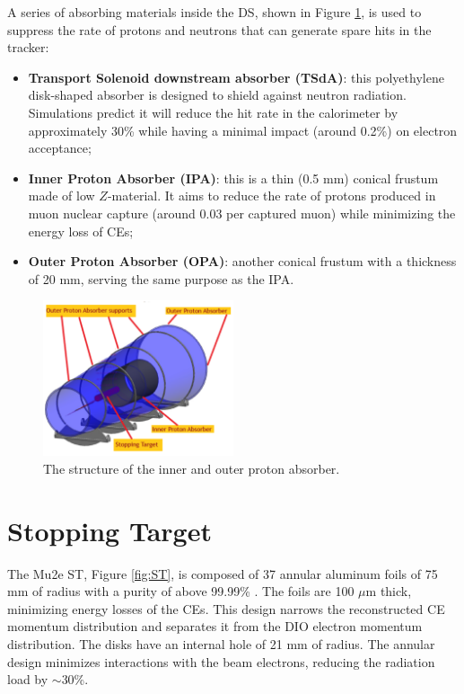 A series of absorbing materials inside the DS, shown in 
Figure \ref{fig:absorbersDS}, is used to suppress 
the rate of protons and neutrons that can generate spare hits in the 
tracker:
\begin{itemize}
    \item \textbf{Transport Solenoid downstream absorber (TSdA)}: this 
    polyethylene disk-shaped absorber is designed to shield against neutron radiation. 
    Simulations predict it will reduce the hit rate in the calorimeter by approximately 30\% 
    while having a minimal impact (around 0.2\%) on electron acceptance;
    \item \textbf{Inner Proton Absorber (IPA)}: this is a thin (0.5 mm) conical 
    frustum made of low $Z$-material. It aims to reduce the rate of protons produced 
    in muon nuclear capture (around 0.03 per captured muon) while minimizing the 
    energy loss of CEs;
    \item \textbf{Outer Proton Absorber (OPA)}: another conical frustum with a 
    thickness of 20 mm, serving the same purpose as the IPA.
\end{itemize}
\begin{figure}[!h]
    \centering
    \includegraphics[width =0.5\textwidth]{figures/png/Screenshot_20240706_132949.png}
    \caption[The structure of the inner and outer proton absorber.]{The structure of the inner and outer proton absorber.}
    \label{fig:absorbersDS}
    \end{figure}




\section{Stopping Target}
The Mu2e ST, Figure \ref{fig:ST}, is 
composed of 37 annular aluminum foils of 75 mm of radius with a purity of 
above 99.99\% \cite{bobbb}. The foils are 100 $\mu$m thick, 
minimizing energy losses of the CEs. This design 
narrows the reconstructed CE momentum distribution 
and separates it from the DIO electron momentum distribution. 
The disks have an internal hole of 21 mm of radius.
The annular design minimizes interactions with the beam electrons, reducing the radiation load by $\sim$30\%.

